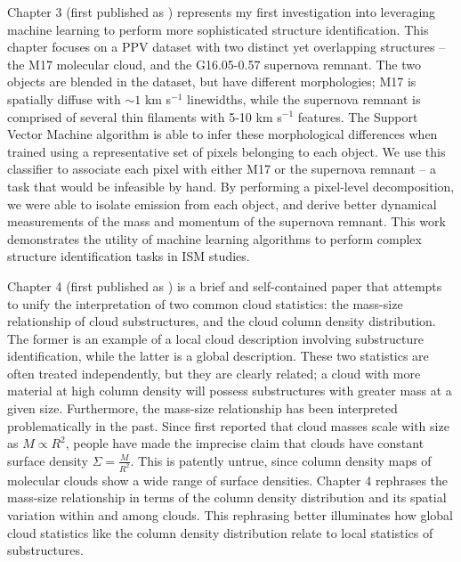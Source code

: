 Chapter 3 (first published as \citealt{Beaumont11}) represents my first investigation into leveraging machine learning to perform more sophisticated structure identification. This chapter focuses on a PPV dataset with two distinct yet overlapping structures -- the M17 molecular cloud, and the G16.05-0.57 supernova remnant. The two objects are blended in the dataset, but have different morphologies; M17 is spatially diffuse with $\sim 1$ km s$^{-1}$ linewidths, while the supernova remnant is comprised of several thin filaments with 5-10 km s$^{-1}$ features. The Support Vector Machine algorithm is able to infer these morphological differences when trained using a representative set of pixels belonging to each object. We use this classifier to associate each pixel with either M17 or the supernova remnant -- a task that would be infeasible by hand. By performing a pixel-level decomposition, we were able to isolate emission from each object, and derive better dynamical measurements of the mass and momentum of the supernova remnant. This work demonstrates the utility of machine learning algorithms to perform complex structure identification tasks in ISM studies.

Chapter 4 (first published as \citealt{Beaumont12}) is a brief and self-contained paper that attempts to unify the interpretation of two common cloud statistics: the mass-size relationship of cloud substructures, and the cloud column density distribution. The former is an example of a local cloud description involving substructure identification, while the latter is a global description. These two statistics are often treated independently, but they are clearly related; a cloud with more material at high column density will possess substructures with greater mass at a given size. Furthermore, the mass-size relationship has been interpreted problematically in the past. Since \cite{Larson81} first reported that cloud masses scale with size as $M \propto R^2$, people have made the imprecise claim that clouds have constant surface density $\Sigma = \frac{M}{R^2}$. This is patently untrue, since column density maps of molecular clouds show a wide range of surface densities. Chapter 4 rephrases the mass-size relationship in terms of the column density distribution and its spatial variation within and among clouds. This rephrasing better illuminates how global cloud statistics like the column density distribution relate to local statistics of substructures.

